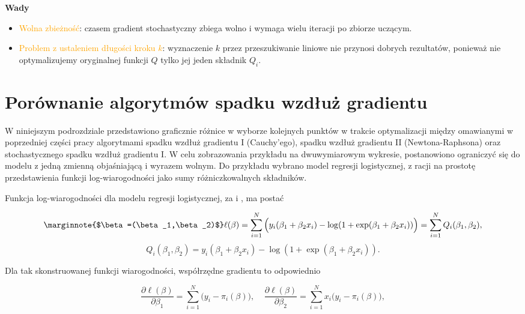 \textbf{Wady}  \vspace{-5pt}
\begin{itemize}
\item \textcolor{orange}{Wolna zbieżność}: czasem gradient stochastyczny zbiega wolno
i wymaga wielu iteracji po zbiorze uczącym.
\item \textcolor{orange}{Problem z ustaleniem długości kroku $k$}: wyznaczenie $k$
przez przeszukiwanie liniowe nie przynosi dobrych rezultatów,
ponieważ nie optymalizujemy oryginalnej funkcji $Q$ tylko jej jeden
składnik $Q_{i}$.
\end{itemize}
\newpage
\section{Porównanie algorytmów spadku wzdłuż gradientu}

W niniejszym podrozdziale przedstawiono graficznie różnice w wyborze kolejnych punktów w trakcie optymalizacji między omawianymi w poprzedniej części pracy algorytmami spadku wzdłuż gradientu I (Cauchy'ego), spadku wzdłuż gradientu II (Newtona-Raphsona) oraz stochastycznego spadku wzdłuż gradientu I. W celu zobrazowania przykładu na dwuwymiarowym wykresie, postanowiono ograniczyć się do modelu z jedną zmienną objaśniającą i wyrazem wolnym. Do przykładu wybrano model regresji logistycznej, z racji na prostotę przedstawienia funkcji log-wiarogodności jako sumy różniczkowalnych składników.

Funkcja log-wiarogodności dla modelu regresji logistycznej, za \cite{czepiel} i \cite{dobson}, ma postać

\begin{equation}\label{logglm}
\marginnote{$\beta=(\beta_1,\beta_2)$}
\ell(\beta) = \sum\limits_{i=1}^{N}\Big(y_i(\beta_1+\beta_2x_i) -\log(1+\exp(\beta_1+\beta_2x_i))\Big) = \sum\limits_{i=1}^{N} Q_i(\beta_1,\beta_2), 
\end{equation}
\begin{equation}
Q_i(\beta_1,\beta_2) = y_i(\beta_1+\beta_2x_i) -\log(1+\exp(\beta_1+\beta_2x_i)).
\end{equation}

Dla tak skonstruowanej funkcji wiarogodności, współrzędne gradientu to odpowiednio

\begin{equation*}
\dfrac{\partial\ell(\beta)}{\partial\beta_1} = \sum\limits_{i=1}^{N}\Big(y_i-\pi_i(\beta)\Big), \ \ \ \ \
\dfrac{\partial\ell(\beta)}{\partial\beta_2} = \sum\limits_{i=1}^{N}x_i\Big(y_i-\pi_i(\beta)\Big),
\end{equation*}

